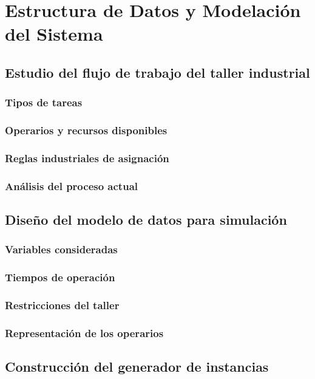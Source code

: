 \chapter{Estructura de Datos y Modelación del Sistema}

\section{Estudio del flujo de trabajo del taller industrial}
    \subsection{Tipos de tareas}
    \subsection{Operarios y recursos disponibles}
    \subsection{Reglas industriales de asignación}
    \subsection{Análisis del proceso actual}

\section{Diseño del modelo de datos para simulación}
    \subsection{Variables consideradas}
    \subsection{Tiempos de operación}
    \subsection{Restricciones del taller}
    \subsection{Representación de los operarios}

\section{Construcción del generador de instancias}
